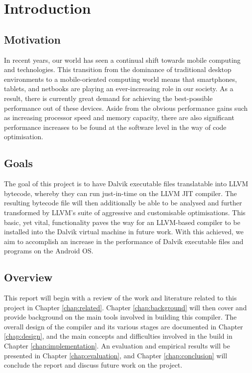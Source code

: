\chapter{Introduction}

\section{Motivation}

In recent years, our world has seen a continual shift towards mobile computing and technologies. This transition from the dominance of traditional desktop environments to a mobile-oriented computing world means that smartphones, tablets, and netbooks are playing an ever-increasing role in our society. As a result, there is currently great demand for achieving the best-possible performance out of these devices. Aside from the obvious performance gains such as increasing processor speed and memory capacity, there are also significant performance increases to be found at the software level in the way of code optimisation.

\section{Goals}

The goal of this project is to have Dalvik executable files translatable into LLVM bytecode, whereby they can run just-in-time on the LLVM JIT compiler. The resulting bytecode file will then additionally be able to be analysed and further transformed by LLVM's suite of aggressive and customisable optimisations. This basic, yet vital, functionality paves the way for an LLVM-based compiler to be installed into the Dalvik virtual machine in future work. With this achieved, we aim to accomplish an increase in the performance of Dalvik executable files and programs on the Android OS.

\section{Overview}

This report will begin with a review of the work and literature related to this project in Chapter \ref{chap:related}. Chapter \ref{chap:background} will then cover and provide background on the main tools involved in building this compiler. The overall design of the compiler and its various stages are documented in Chapter \ref{chap:design}, and the main concepts and difficulties involved in the build in Chapter \ref{chap:implementation}. An evaluation and empirical results will be presented in Chapter \ref{chap:evaluation}, and Chapter \ref{chap:conclusion} will conclude the report and discuss future work on the project.
